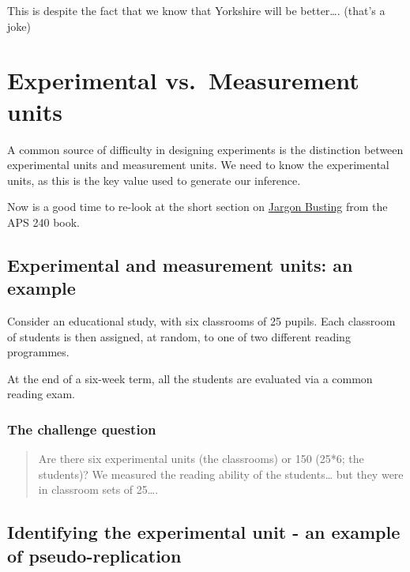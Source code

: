 \documentclass[
]{book}
\begin{document}
This is despite the fact that we know that Yorkshire will be better\ldots. (that's a joke)

\hypertarget{experimental-vs.-measurement-units}{%
\section{Experimental vs.~Measurement units}\label{experimental-vs.-measurement-units}}

A common source of difficulty in designing experiments is the distinction between experimental units and measurement units. We need to know the experimental units, as this is the key value used to generate our inference.

Now is a good time to re-look at the short section on \href{https://dzchilds.github.io/stats-for-bio/principles-experimental-design.html\#jargon-busting}{Jargon Busting} from the APS 240 book.

\hypertarget{experimental-and-measurement-units-an-example}{%
\subsection{Experimental and measurement units: an example}\label{experimental-and-measurement-units-an-example}}

Consider an educational study, with six classrooms of 25 pupils. Each classroom of students is then assigned, at random, to one of two different reading programmes.

At the end of a six-week term, all the students are evaluated via a common reading exam.

\hypertarget{the-challenge-question}{%
\subsubsection{The challenge question}\label{the-challenge-question}}

\begin{quote}
Are there six experimental units (the classrooms) or 150 (25*6; the students)? We measured the reading ability of the students\ldots{} but they were in classroom sets of 25\ldots.
\end{quote}

\hypertarget{identifying-the-experimental-unit---an-example-of-pseudo-replication}{%
\subsection{\texorpdfstring{Identifying the experimental unit - an example of \textbf{pseudo-replication}}{Identifying the experimental unit - an example of pseudo-replication}}\label{identifying-the-experimental-unit---an-example-of-pseudo-replication}}
\end{document}
